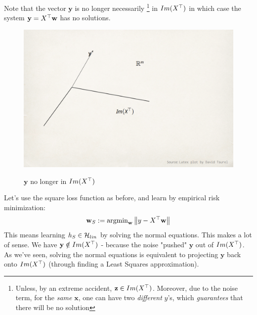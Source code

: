 Note that the vector $\mathbf{y}$ is no longer necessarily \footnote{Unless, by an extreme accident, $\mathbf{z}\in Im(X^{\top})$. Moreover, due to the noise term, for the \textit{same} $\mathbf{x}$, one can have two \textit{different} $y$'s, which \textit{guarantees} that there will be no solution} in $Im(X^{\top})$ in which case the system $\mathbf{y}=X^{\top} \mathbf{w}$ has no solutions.



\begin{figure}[h!]
  \centering
    \includegraphics[width=4.5in]{PlotTsurel.png} \\
 \caption{$\mathbf{y}$ no longer in $Im(X^{\top})$}
\end{figure}



 Let's use the square loss function as before, and learn by empirical risk minimization:
         \[\mathbf{w}_S := \text{argmin}_{\mathbf{w}}\left\| y - X^{\top} \mathbf{w}\right\|
         \]
        This means learning $h_S\in\mathcal{H}_{lin}$ by solving the normal equations. This makes a lot of sense.  We have
         $\mathbf{y}\notin Im(X^{\top})$ - because the noise "pushed" $\mathbf{y}$ out of $Im(X^{\top})$. As we've seen, solving the normal equations is equivalent to
         projecting $\mathbf{y}$ back onto $Im(X^{\top})$ (through finding a Least Squares approximation).


